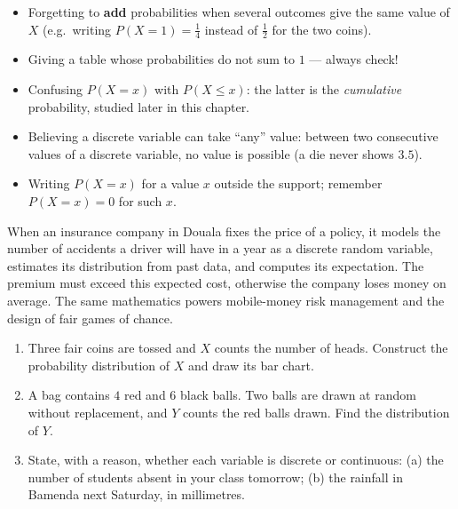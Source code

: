 \documentclass[11pt]{article}
\begin{document}
\begin{attention}
\begin{itemize}
\item Forgetting to \textbf{add} probabilities when several outcomes give the same value of $X$ (e.g.\ writing $P(X=1) = \tfrac14$ instead of $\tfrac12$ for the two coins).
\item Giving a table whose probabilities do not sum to $1$ — always check!
\item Confusing $P(X = x)$ with $P(X \le x)$: the latter is the \emph{cumulative} probability, studied later in this chapter.
\item Believing a discrete variable can take ``any'' value: between two consecutive values of a discrete variable, no value is possible (a die never shows $3.5$).
\item Writing $P(X=x)$ for a value $x$ outside the support; remember $P(X=x)=0$ for such $x$.
\end{itemize}
\end{attention}

\begin{savaistu}
When an insurance company in Douala fixes the price of a policy, it models the number of accidents a driver will have in a year as a discrete random variable, estimates its distribution from past data, and computes its expectation. The premium must exceed this expected cost, otherwise the company loses money on average. The same mathematics powers mobile-money risk management and the design of fair games of chance.
\end{savaistu}

\begin{exercice}[Practice]
\begin{enumerate}
\item Three fair coins are tossed and $X$ counts the number of heads. Construct the probability distribution of $X$ and draw its bar chart.
\item A bag contains $4$ red and $6$ black balls. Two balls are drawn at random without replacement, and $Y$ counts the red balls drawn. Find the distribution of $Y$.
\item State, with a reason, whether each variable is discrete or continuous: (a) the number of students absent in your class tomorrow; (b) the rainfall in Bamenda next Saturday, in millimetres.
\end{enumerate}
\end{exercice}
\end{document}
